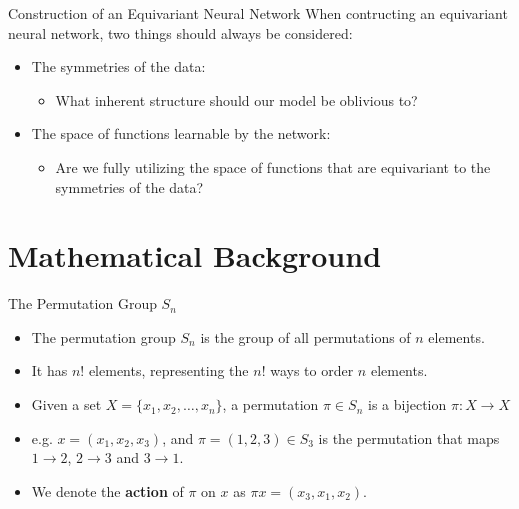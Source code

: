 \documentclass{beamer}
\begin{document}
\begin{frame}{Construction of an Equivariant Neural Network}
    When contructing an equivariant neural network, two things should always be considered:
    \begin{itemize} 
        \setlength{\itemsep}{\fill}
            \pause
        \item The symmetries of the data:
        \begin{itemize}
            \item What inherent structure should our model be oblivious to?
        \end{itemize}
        \item The space of functions learnable by the network:\\ 
        \begin{itemize}
            \item Are we fully utilizing the space of functions that are equivariant to the symmetries of the data?
        \end{itemize}
    \end{itemize}
    
\end{frame}

\section{Mathematical Background}




\begin{frame}{The Permutation Group $S_n$}

    \begin{itemize}
        \setlength{\itemsep}{\fill}
        \item The permutation group $S_n$ is the group of all permutations of $n$ elements.
        \item It has $n!$ elements, representing the $n!$ ways to order $n$ elements.
        \item Given a set $X = \{x_1, x_2, \ldots, x_n\}$, a permutation $\pi \in S_n$ is a bijection $\pi: X \rightarrow X$
        \item e.g. $x = (x_1, x_2, x_3)$, and $\pi = (1, 2, 3) \in S_3$ is the permutation that maps $1 \rightarrow 2$, $2 \rightarrow 3$ and $3 \rightarrow 1$.
        \item We denote the \textbf{action} of $\pi$ on $x$ as $\pi x = (x_3, x_1, x_2)$. 
    \end{itemize}

    
\end{frame}
\end{document}

